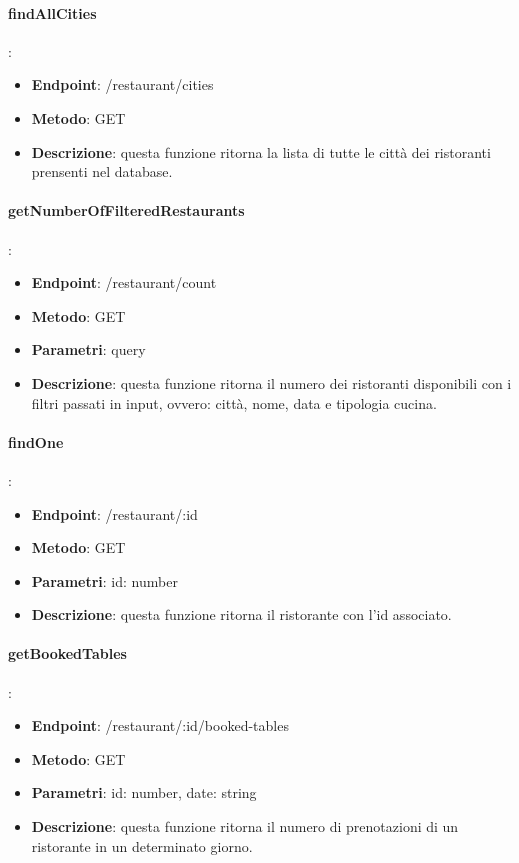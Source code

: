 \paragraph{findAllCities}:
\begin{itemize}
    \item \textbf{Endpoint}: /restaurant/cities
    \item \textbf{Metodo}: GET
    \item \textbf{Descrizione}: questa funzione ritorna la lista di tutte le città dei ristoranti prensenti nel database.
\end{itemize}
\paragraph{getNumberOfFilteredRestaurants}:
\begin{itemize}
    \item \textbf{Endpoint}: /restaurant/count
    \item \textbf{Metodo}: GET
    \item \textbf{Parametri}: query
    \item \textbf{Descrizione}: questa funzione ritorna il numero dei ristoranti disponibili con i filtri passati in input, ovvero: città, nome, data e tipologia cucina.
\end{itemize}
\paragraph{findOne}:
\begin{itemize}
    \item \textbf{Endpoint}: /restaurant/:id
    \item \textbf{Metodo}: GET
    \item \textbf{Parametri}: id: number
    \item \textbf{Descrizione}: questa funzione ritorna il ristorante con l'id associato.
\end{itemize}
\paragraph{getBookedTables}:
\begin{itemize}
    \item \textbf{Endpoint}: /restaurant/:id/booked-tables
    \item \textbf{Metodo}: GET
    \item \textbf{Parametri}: id: number, date: string
    \item \textbf{Descrizione}: questa funzione ritorna il numero di prenotazioni di un ristorante in un determinato giorno.
\end{itemize}
